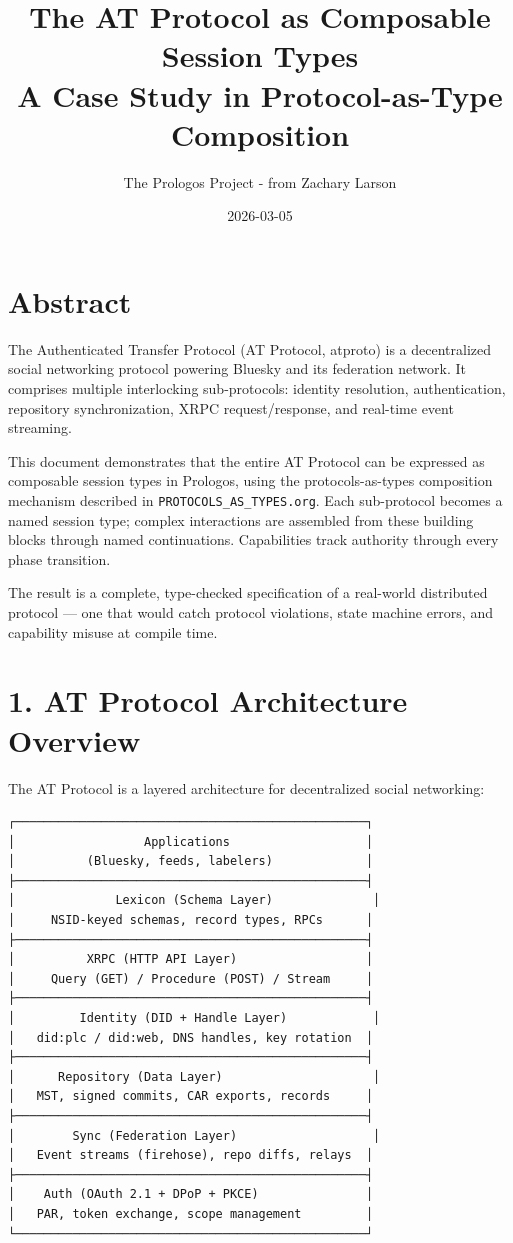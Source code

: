\documentclass[11pt]{article}
\author{The Prologos Project - from Zachary Larson}
\date{2026-03-05}
\title{The AT Protocol as Composable Session Types\\\medskip
\large A Case Study in Protocol-as-Type Composition}
\begin{document}
\maketitle
\tableofcontents

\section{Abstract}
\label{sec:org6752801}

The Authenticated Transfer Protocol (AT Protocol, atproto) is a decentralized
social networking protocol powering Bluesky and its federation network. It
comprises multiple interlocking sub-protocols: identity resolution,
authentication, repository synchronization, XRPC request/response, and
real-time event streaming.

This document demonstrates that the entire AT Protocol can be expressed as
composable session types in Prologos, using the protocols-as-types composition
mechanism described in \texttt{PROTOCOLS\_AS\_TYPES.org}. Each sub-protocol becomes a
named session type; complex interactions are assembled from these building
blocks through named continuations. Capabilities track authority through every
phase transition.

The result is a complete, type-checked specification of a real-world
distributed protocol --- one that would catch protocol violations, state
machine errors, and capability misuse at compile time.
\section{1. AT Protocol Architecture Overview}
\label{sec:orga363c2f}

The AT Protocol is a layered architecture for decentralized social networking:

\begin{verbatim}
┌─────────────────────────────────────────────────┐
│                  Applications                   │
│          (Bluesky, feeds, labelers)             │
├─────────────────────────────────────────────────┤
│              Lexicon (Schema Layer)              │
│     NSID-keyed schemas, record types, RPCs      │
├─────────────────────────────────────────────────┤
│          XRPC (HTTP API Layer)                  │
│     Query (GET) / Procedure (POST) / Stream     │
├─────────────────────────────────────────────────┤
│         Identity (DID + Handle Layer)            │
│   did:plc / did:web, DNS handles, key rotation  │
├─────────────────────────────────────────────────┤
│      Repository (Data Layer)                     │
│   MST, signed commits, CAR exports, records     │
├─────────────────────────────────────────────────┤
│        Sync (Federation Layer)                   │
│   Event streams (firehose), repo diffs, relays  │
├─────────────────────────────────────────────────┤
│    Auth (OAuth 2.1 + DPoP + PKCE)               │
│   PAR, token exchange, scope management         │
└─────────────────────────────────────────────────┘
\end{verbatim}
\end{document}
